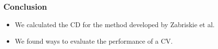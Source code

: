 \documentclass{beamer}
\begin{document}
\begin{frame} 
  \frametitle{Conclusion}
  \begin{itemize}
    \item We calculated the CD for the method developed by Zabriskie et al. 
    \item We found ways to evaluate the performance of a CV.
  \end{itemize}
\end{frame}
\end{document}

